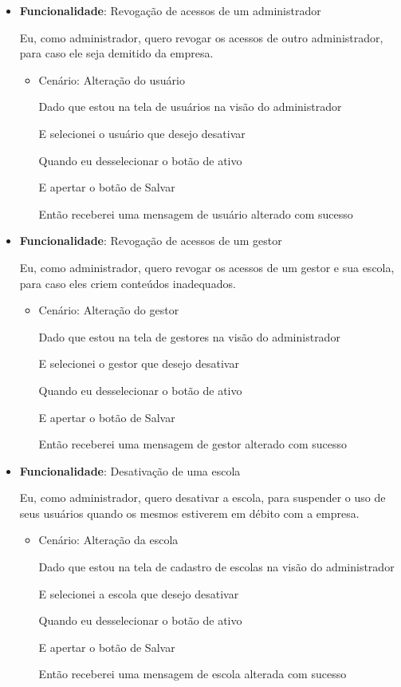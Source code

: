 \begin{itemize}
\item\textbf{Funcionalidade}: Revogação de acessos de um administrador
    
    Eu, como administrador, quero revogar os acessos de outro administrador, para caso ele seja demitido da empresa.
    \begin{itemize}
        \item Cenário: Alteração do usuário
        \par Dado que estou na tela de usuários na visão do administrador
        \par E selecionei o usuário que desejo desativar
        \par Quando eu desselecionar o botão de ativo 
        \par E apertar o botão de Salvar
        \par Então receberei uma mensagem de usuário alterado com sucesso
    \end{itemize}   

\item\textbf{Funcionalidade}: Revogação de acessos de um gestor
    
    Eu, como administrador, quero revogar os acessos de um gestor e sua escola, para caso eles criem conteúdos inadequados.
    \begin{itemize}
        \item Cenário: Alteração do gestor
        \par Dado que estou na tela de gestores na visão do administrador
        \par E selecionei o gestor que desejo desativar
        \par Quando eu desselecionar o botão de ativo
        \par E apertar o botão de Salvar
        \par Então receberei uma mensagem de gestor alterado com sucesso
    \end{itemize}  

\item\textbf{Funcionalidade}: Desativação de uma escola
    
    Eu, como administrador, quero desativar a escola, para suspender o uso de seus usuários quando os mesmos estiverem em débito com a empresa.
    \begin{itemize}
        \item Cenário: Alteração da escola  
        \par Dado que estou na tela de cadastro de escolas na visão do administrador
        \par E selecionei a escola que desejo desativar
        \par Quando eu desselecionar o botão de ativo
        \par E apertar o botão de Salvar
        \par Então receberei uma mensagem de escola alterada com sucesso
    \end{itemize}   
    

\end{itemize}
